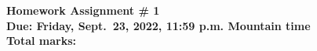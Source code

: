 \documentclass[11pt]{article}
\begin{document}
\thispagestyle{plain}

\begin{center}
\bfseries
{\Large Homework Assignment \# 1}\\
   Due: Friday, Sept.\ 23, 2022, 11:59 p.m. Mountain time\\
   Total marks: 
\end{center}



 










\label{EndOfAssignment}%
\end{document}
